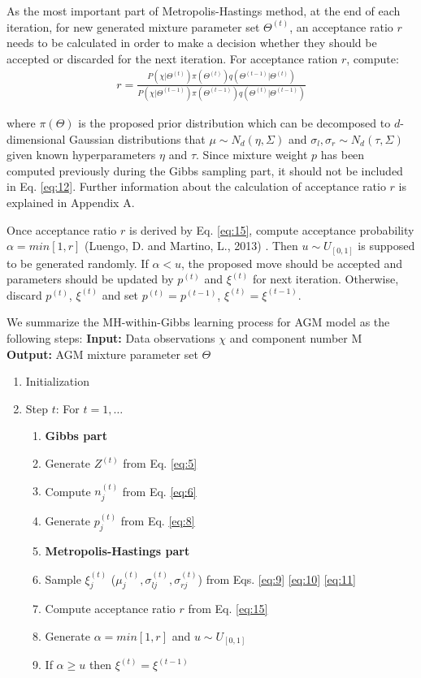 \documentclass[conference]{IEEEtran}
\begin{document}
As the most important part of Metropolis-Hastings method, at the end of each iteration, for new generated mixture parameter set $\Theta^{(t)}$, an acceptance ratio $r$ needs to be calculated in order to make a decision whether they should be accepted or discarded for the next iteration. For acceptance ration $r$, compute:
\begin{align}
r = \frac{P(\chi|\Theta^{(t)})\pi(\Theta^{(t)})q(\Theta^{(t-1)}|\Theta^{(t)})}{P(\chi|\Theta^{(t-1)})\pi(\Theta^{(t-1)})q(\Theta^{(t)}|\Theta^{(t-1)})}
\label{eq:12}
\end{align}

where $\pi(\Theta)$ is the proposed prior distribution which can be decomposed to $d$-dimensional Gaussian distributions that $\mu \sim \textit{N}_d(\eta,\Sigma)$ and $\sigma_l, \sigma_r \sim \textit{N}_d(\tau,\Sigma)$ given known hyperparameters $\eta$ and $\tau$. Since mixture weight $p$ has been computed previously during the Gibbs sampling part, it should not be included in Eq. \eqref{eq:12}. Further information about the calculation of acceptance ratio $r$ is explained in Appendix A.

Once acceptance ratio $r$ is derived by Eq. \eqref{eq:15}, compute acceptance probability $\alpha = min[1,r]$ (Luengo, D. and Martino, L., 2013) \cite{b9}. Then $u \sim U_{[0,1]}$ is supposed to be generated randomly. If $\alpha < u$, the proposed move should be accepted and parameters should be updated by $p^{(t)}$ and $\xi^{(t)}$ for next iteration. Otherwise, discard $p^{(t)}$, $\xi^{(t)}$ and set $p^{(t)} = p^{(t-1)}$, $\xi^{(t)} = \xi^{(t-1)}$.

We summarize the MH-within-Gibbs learning process for AGM model as the following steps:
\bigbreak
\noindent\textbf{Input:} Data observations $\chi$ and component number M \\
\textbf{Output:} AGM mixture parameter set $\Theta$
\bigbreak

\begin{enumerate}
\item Initialization
\item Step $t$: For $t = 1,\ldots$
\begin{enumerate}
\item[]\textbf{Gibbs part}
\item Generate $Z^{(t)}$ from Eq. \eqref{eq:5}
\item Compute $n_j^{(t)}$ from Eq. \eqref{eq:6}
\item Generate $p_j^{(t)}$ from Eq. \eqref{eq:8}
\item[] \textbf{Metropolis-Hastings part}
\item Sample $\xi_j^{(t)}$ ($\mu_j^{(t)}, \sigma_{lj}^{(t)}, \sigma_{rj}^{(t)}$) from Eqs. \eqref{eq:9} \eqref{eq:10} \eqref{eq:11}
\item Compute acceptance ratio $r$ from Eq. \eqref{eq:15}
\item Generate $\alpha = min[1,r]$ and $u \sim U_{[0,1]}$
\item If $\alpha \geq u$ then $\xi^{(t)} = \xi^{(t-1)}$
\end{enumerate}
\end{enumerate}
\end{document}
